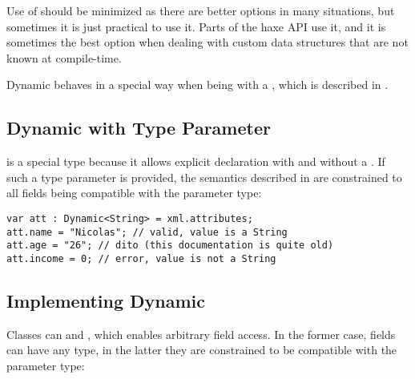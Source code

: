 \documentclass{haxe}
\begin{document}

Use of  should be minimized as there are better options in many situations, but sometimes it is just practical to use it. Parts of the haxe  API use it, and it is sometimes the best option when dealing with custom data structures that are not known at compile-time.

Dynamic behaves in a special way when being  with a , which is described in .


\subsection{Dynamic with Type Parameter}
\label{types-dynamic-with-type-parameter}

 is a special type because it allows explicit declaration with and without a . If such a type parameter is provided, the semantics described in  are constrained to all fields being compatible with the parameter type:

\begin{lstlisting}
var att : Dynamic<String> = xml.attributes;
att.name = "Nicolas"; // valid, value is a String
att.age = "26"; // dito (this documentation is quite old)
att.income = 0; // error, value is not a String
\end{lstlisting}


\subsection{Implementing Dynamic}
\label{types-dynamic-implemented}

Classes can   and , which enables arbitrary field access. In the former case, fields can have any type, in the latter they are constrained to be compatible with the parameter type:
\end{document}
